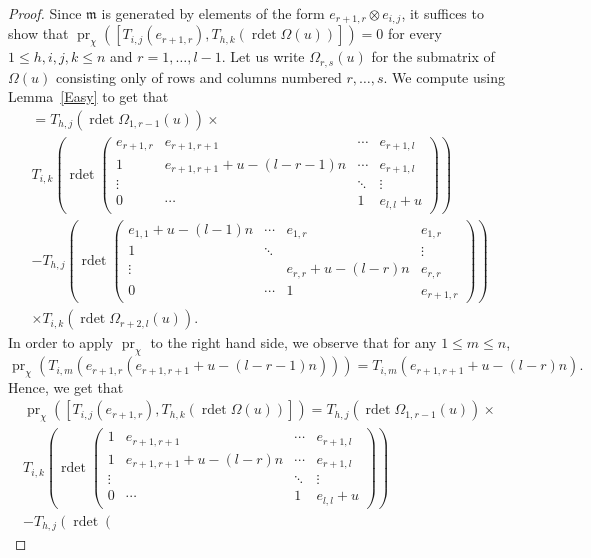 \documentclass[twoside,12pt,reqno]{amsart}
\def\rdet{\operatorname{rdet}}
\def\pr{{\operatorname{pr}}}
\begin{document}
\begin{proof}
Since $\mathfrak m$ is generated by elements of the form
$e_{r+1,r} \otimes e_{i,j}$, it suffices to show that 
$\pr_\chi ([T_{i,j}(e_{r+1,r}),T_{h,k}(\rdet \Omega(u))]) = 0$
for every $1 \leq h,i,j,k \leq n$ and 
$r = 1,\dots,l-1$.
Let us write $\Omega_{r, s}(u)$ for the submatrix of
$\Omega(u)$ consisting only of rows and columns 
numbered $r,\dots,s$.
We compute using Lemma~\ref{Easy} to get that
\begin{multline*}
[T_{i,j}(e_{r+1,r}), T_{h,k}(\rdet \Omega(u))]
=T_{h,j}(\rdet \Omega_{1, r-1}(u))\times\\
T_{i,k}
\left(
\rdet
\left(
\begin{array}{ccccc}
e_{r+1,r}&e_{r+1,r+1}&\cdots&e_{r+1,l}\\
1&e_{r+1,r+1}+u-(l-r-1)n &\cdots & e_{r+1,l}\\\vdots&&\ddots&\vdots\\
0&\cdots&1&e_{l,l}+u
\end{array}
\right)\right)\\
-
T_{h,j}
\left(
\rdet 
 \left(
\begin{array}{ccccc}
e_{1,1}+u-(l-1)n &\cdots & e_{1,r}&e_{1,r}\\
1&\ddots&&\vdots\\
\vdots&&e_{r,r} +u-(l-r)n&e_{r,r}\\
0&\cdots&1&e_{r+1,r}
\end{array}
\right)\right)\\
\times T_{i,k}(\rdet \Omega_{r+2, l}(u)).
\end{multline*}
In order to apply $\pr_\chi$ to the right hand side, we observe 
that for any $1 \leq m \leq n$,
$$
\pr_\chi \left(T_{i,m}\left(e_{r+1,r} \left(e_{r+1,r+1}+u -{\textstyle
(l-r-1)n}\right)\right)\right)
=
T_{i,m}\left(e_{r+1,r+1} +u -{\textstyle (l-r)n}\right).
$$
Hence,
we get that
\begin{multline*}
\pr_\chi ([T_{i,j}(e_{r+1,r}), T_{h,k}(\rdet \Omega(u))])
=
T_{h,j}(\rdet \Omega_{1,r-1}(u))\times\\
T_{i,k}
\left(
\rdet
\left(
\begin{array}{ccccc}
1&e_{r+1,r+1}&\cdots&e_{r+1,l}\\
1&e_{r+1,r+1}+u -(l-r)n &\cdots & e_{r+1,l}\\\vdots&&\ddots&\vdots\\
0&\cdots&1&e_{l,l}+u
\end{array}
\right)\right)\\
-
T_{h,j}
\left(
\rdet 
 \left(
\begin{array}{ccccc}

\end{array}
\end{multline*}
\end{proof}
\end{document}
